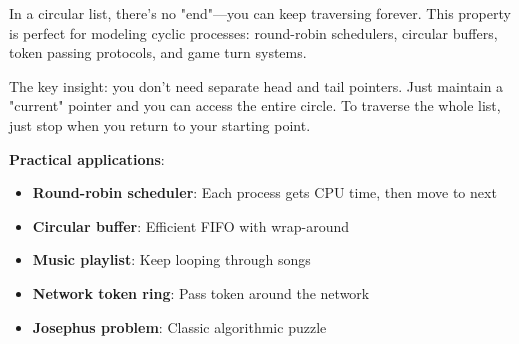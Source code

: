 In a circular list, there's no "end"—you can keep traversing forever. This property is perfect for modeling cyclic processes: round-robin schedulers, circular buffers, token passing protocols, and game turn systems.

The key insight: you don't need separate head and tail pointers. Just maintain a "current" pointer and you can access the entire circle. To traverse the whole list, just stop when you return to your starting point.

\textbf{Practical applications}:
\begin{itemize}
    \item \textbf{Round-robin scheduler}: Each process gets CPU time, then move to next
    \item \textbf{Circular buffer}: Efficient FIFO with wrap-around
    \item \textbf{Music playlist}: Keep looping through songs
    \item \textbf{Network token ring}: Pass token around the network
    \item \textbf{Josephus problem}: Classic algorithmic puzzle
\end{itemize}

